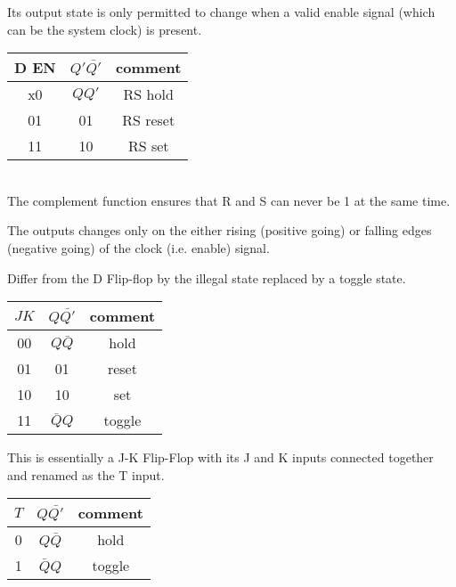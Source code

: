 \documentclass[a4paper]{article}
\begin{document}
\begin{defi}
Its output state is only permitted to change when a valid enable signal (which can be the system clock) is present.\\
\begin{tabular}{|c|c|c|}
\hline 
D EN & $Q'\bar{Q'}$ & comment \\ 
\hline 
x0 & $QQ'$ & RS hold \\ 
\hline 
01 & 01 & RS reset \\ 
\hline 
11 & 10 & RS set \\ 
\hline 
\end{tabular} \\
The complement function ensures that R and S can never be 1 at the same time.
\end{defi}

\begin{defi}
The outputs changes only on the either rising (positive going) or falling edges (negative going) of the clock (i.e. enable) signal.
\end{defi}

\begin{defi}
Differ from the D Flip-flop by the illegal state replaced by a toggle state.\\
\begin{tabular}{|c|c|c|}
\hline 
$JK$ & $Q\bar{Q'}$ & comment \\ 
\hline 
00 & $Q\bar{Q}$ & hold \\ 
\hline 
01 & 01 & reset \\ 
\hline 
10 & 10 & set \\ 
\hline 
11 & $\bar{Q}Q$ & toggle \\ 
\hline 
\end{tabular} 
\end{defi}

\begin{defi}
This is essentially a J-K Flip-Flop with its J and K inputs connected together and renamed as the T input.\\
\begin{tabular}{|c|c|c|}
\hline 
$T$ & $Q\bar{Q'}$ & comment \\ 
\hline 
0 & $Q\bar{Q}$ & hold \\ 
\hline 
1 & $\bar{Q}Q$ & toggle \\ 
\hline 
\end{tabular} 
\end{defi}
\end{document}
